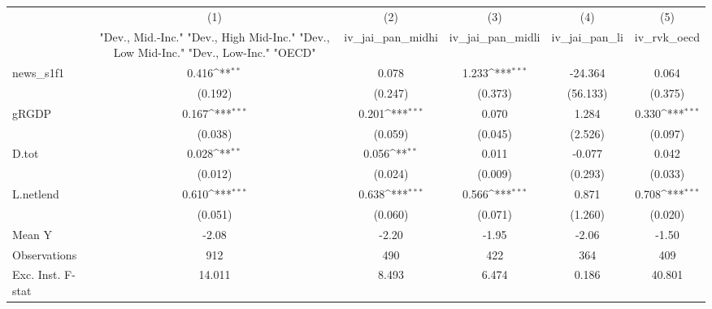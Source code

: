 {
\def\sym#1{\ifmmode^{#1}\else\(^{#1}\)\fi}
\begin{tabular}{l*{5}{c}}
\toprule
            &\multicolumn{1}{c}{(1)}&\multicolumn{1}{c}{(2)}&\multicolumn{1}{c}{(3)}&\multicolumn{1}{c}{(4)}&\multicolumn{1}{c}{(5)}\\
            &\multicolumn{1}{c}{ "Dev., Mid.-Inc." "Dev., High Mid-Inc." "Dev., Low Mid-Inc." "Dev., Low-Inc." "OECD" }&\multicolumn{1}{c}{iv\_jai\_pan\_midhi}&\multicolumn{1}{c}{iv\_jai\_pan\_midli}&\multicolumn{1}{c}{iv\_jai\_pan\_li}&\multicolumn{1}{c}{iv\_rvk\_oecd}\\
\midrule
news\_s1f1   &       0.416\sym{**} &       0.078         &       1.233\sym{***}&     -24.364         &       0.064         \\
            &     (0.192)         &     (0.247)         &     (0.373)         &    (56.133)         &     (0.375)         \\
\addlinespace
gRGDP       &       0.167\sym{***}&       0.201\sym{***}&       0.070         &       1.284         &       0.330\sym{***}\\
            &     (0.038)         &     (0.059)         &     (0.045)         &     (2.526)         &     (0.097)         \\
\addlinespace
D.tot       &       0.028\sym{**} &       0.056\sym{**} &       0.011         &      -0.077         &       0.042         \\
            &     (0.012)         &     (0.024)         &     (0.009)         &     (0.293)         &     (0.033)         \\
\addlinespace
L.netlend   &       0.610\sym{***}&       0.638\sym{***}&       0.566\sym{***}&       0.871         &       0.708\sym{***}\\
            &     (0.051)         &     (0.060)         &     (0.071)         &     (1.260)         &     (0.020)         \\
\midrule
Mean Y      &       -2.08         &       -2.20         &       -1.95         &       -2.06         &       -1.50         \\
Observations&         912         &         490         &         422         &         364         &         409         \\
Exc. Inst. F-stat&      14.011         &       8.493         &       6.474         &       0.186         &      40.801         \\
\bottomrule
\end{tabular}
}
